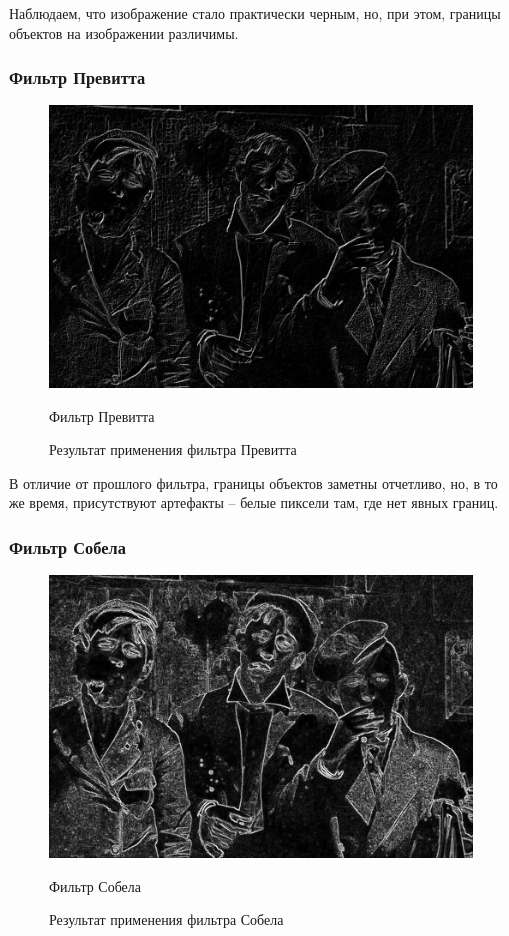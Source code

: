 Наблюдаем, что изображение стало практически черным, но, при этом, границы объектов на изображении различимы. 

\subsubsection{Фильтр Превитта}

\begin{figure}[ht!]
  \centering
  \includegraphics[width=\textwidth]{../Edge_Detection/Prewitt_Smoking_boys.jpg}
  \caption{Фильтр Превитта}
  \caption{Результат применения фильтра Превитта}
  \label{img:prewitt}  
\end{figure}
\FloatBarrier

В отличие от прошлого фильтра, границы объектов заметны отчетливо, но, в то же время, присутствуют артефакты -- белые пиксели там, где нет явных границ. 
\subsubsection{Фильтр Собела}

\begin{figure}[ht!]
  \centering
  \includegraphics[width=\textwidth]{../Edge_Detection/Sobel_Smoking_boys.jpg}
  \caption{Фильтр Собела}
  \caption{Результат применения фильтра Собела}
  \label{img:sobel}  
\end{figure}
\FloatBarrier

